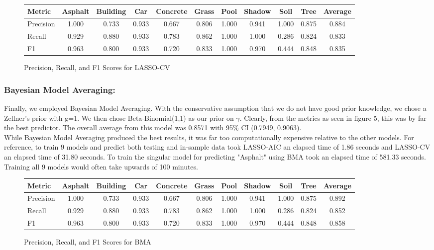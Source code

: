 \documentclass[11pt]{article}
\begin{document}
\begin{figure}
  \centering
  \begin{tabular}{lcccccccccc}
    \toprule
    Metric & Asphalt & Building & Car & Concrete & Grass & Pool & Shadow & Soil & Tree & Average \\
    \midrule
    Precision & 1.000 & 0.733 & 0.933 & 0.667 & 0.806 & 1.000 & 0.941 & 1.000 & 0.875 & 0.884 \\
    Recall & 0.929 & 0.880 & 0.933 & 0.783 & 0.862 & 1.000 & 1.000 & 0.286 & 0.824 & 0.833 \\
    F1 & 0.963 & 0.800 & 0.933 & 0.720 & 0.833 & 1.000 & 0.970 & 0.444 & 0.848 & 0.835 \\
    \bottomrule
  \end{tabular}
  \caption{Precision, Recall, and F1 Scores for LASSO-CV}
  \label{tab:precision_recall_f1_transposed}
\end{figure}

\subsubsection{Bayesian Model Averaging:}

Finally, we employed Bayesian Model Averaging. With the conservative assumption that we do not have good prior knowledge, we chose a Zellner’s prior with g=1. We then chose Beta-Binomial(1,1) as our prior on $\gamma$. Clearly, from the metrics as seen in figure 5, this was by far the best predictor. The overall average from this model was 0.8571 with 95\% CI (0.7949, 0.9063). \\

While Bayesian Model Averaging produced the best results, it was far too computationally expensive relative to the other models. For reference, to train 9 models and predict both testing and in-sample data took LASSO-AIC an elapsed time of 1.86 seconds and LASSO-CV an elapsed time of 31.80 seconds. To train the singular model for predicting "Asphalt" using BMA  took an elapsed time of 581.33 seconds. Training all 9 models would often take upwards of 100 minutes.

\begin{figure}
  \centering
  \begin{tabular}{lcccccccccc}
    \toprule
    Metric & Asphalt & Building & Car & Concrete & Grass & Pool & Shadow & Soil & Tree & Average \\
    \midrule
    Precision & 1.000 & 0.733 & 0.933 & 0.667 & 0.806 & 1.000 & 0.941 & 1.000 & 0.875 & 0.892 \\
    Recall & 0.929 & 0.880 & 0.933 & 0.783 & 0.862 & 1.000 & 1.000 & 0.286 & 0.824 & 0.852 \\
    F1 & 0.963 & 0.800 & 0.933 & 0.720 & 0.833 & 1.000 & 0.970 & 0.444 & 0.848 & 0.858 \\
    \bottomrule
  \end{tabular}
  \caption{Precision, Recall, and F1 Scores for BMA}
  \label{tab:precision_recall_f1_transposed}
\end{figure}
\end{document}
